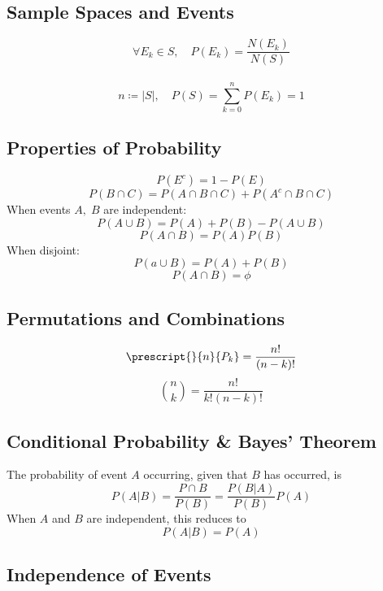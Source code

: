 \documentclass[10pt,twoside,a4paper]{article}
\begin{document}
\begin{multicols*}{2}
\begin{flushleft}
	\subsection{Sample Spaces and Events}
	$$\forall E_k \in S, \quad P(E_k) = \frac{N(E_k)}{N(S)}$$\\
	$$n \coloneqq |S|,\quad P(S) = \sum^{n}_{k=0}P(E_k) = 1$$

	\subsection{Properties of Probability}
	$$P(E^c) = 1 - P(E)$$
	$$P(B \cap C) = P(A \cap B \cap C) + P(A^c \cap B \cap C)$$
	\linebreak
	When events $A,\; B$ are independent:
	$$P(A \cup B) = P(A) + P(B) - P(A \cup B)$$
	$$P(A \cap B) = P(A)P(B)$$
	\linebreak
	When disjoint:
	$$P(a \cup B) = P(A) + P(B)$$
	$$P(A \cap B) = \phi$$

	\subsection{Permutations and Combinations}
	$$\prescript{}{n}{P_k} = \frac{n!}{(n-k)!}$$
	$$\binom{n}{k} = \frac{n!}{k!(n-k)!}$$

	\subsection{Conditional Probability \& Bayes' Theorem}
	The probability of event $A$ occurring, given that $B$ has occurred, is
	$$P(A|B) = \frac{P \cap B}{P(B)} = \frac{P(B|A)}{P(B)}P(A)$$
	When $A$ and $B$ are independent, this reduces to
	$$P(A|B) = P(A)$$



	\subsection{Independence of Events}




\end{flushleft}
\end{multicols*}
\end{document}
